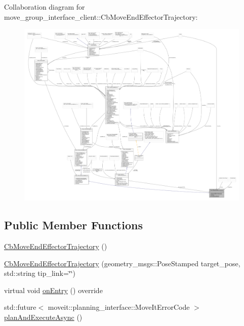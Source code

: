 Collaboration diagram for move\+\_\+group\+\_\+interface\+\_\+client\+:\+:Cb\+Move\+End\+Effector\+Trajectory\+:
\nopagebreak
\begin{figure}[H]
\begin{center}
\leavevmode
\includegraphics[width=350pt]{classmove__group__interface__client_1_1CbMoveEndEffectorTrajectory__coll__graph}
\end{center}
\end{figure}
\subsection*{Public Member Functions}
\begin{DoxyCompactItemize}
\item 
\hyperlink{classmove__group__interface__client_1_1CbMoveEndEffectorTrajectory_ab5390660a09e5bbc1c4db27974e43ce0}{Cb\+Move\+End\+Effector\+Trajectory} ()
\item 
\hyperlink{classmove__group__interface__client_1_1CbMoveEndEffectorTrajectory_a7426a1f7c6452389a86ca66d02d2ecbf}{Cb\+Move\+End\+Effector\+Trajectory} (geometry\+\_\+msgs\+::\+Pose\+Stamped target\+\_\+pose, std\+::string tip\+\_\+link=\char`\"{}\char`\"{})
\item 
virtual void \hyperlink{classmove__group__interface__client_1_1CbMoveEndEffectorTrajectory_a0ff801749e1f988953cda8300a6a9d6f}{on\+Entry} () override
\item 
std\+::future$<$ moveit\+::planning\+\_\+interface\+::\+Move\+It\+Error\+Code $>$ \hyperlink{classmove__group__interface__client_1_1CbMoveEndEffectorTrajectory_ad37d99d3aec32711ae884793be80b666}{plan\+And\+Execute\+Async} ()
\end{DoxyCompactItemize}
